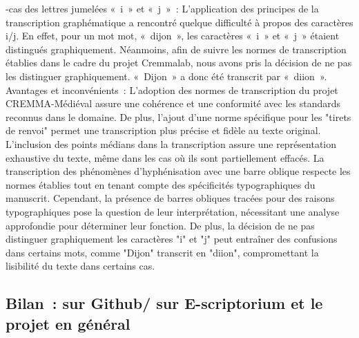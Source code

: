 \documentclass[12pt,a4paper,oneside]{article} %
\begin{document}
-cas des lettres jumelées « i » et « j » : L’application des principes de la transcription graphématique a rencontré quelque difficulté à propos des caractères i/j. En effet, pour un mot mot, « dijon », les caractères « i » et « j » étaient distingués graphiquement. Néanmoins, afin de suivre les normes de transcription établies dans le cadre du projet Cremmalab, nous avons pris la décision de ne pas les distinguer graphiquement. « Dijon » a donc été transcrit par « diion ».
Avantages et inconvénients : L'adoption des normes de transcription du projet CREMMA-Médiéval assure une cohérence et une conformité avec les standards reconnus dans le domaine. De plus, l'ajout d'une norme spécifique pour les "tirets de renvoi" permet une transcription plus précise et fidèle au texte original. L'inclusion des points médians dans la transcription assure une représentation exhaustive du texte, même dans les cas où ils sont partiellement effacés. La transcription des phénomènes d'hyphénisation avec une barre oblique respecte les normes établies tout en tenant compte des spécificités typographiques du manuscrit. Cependant, la présence de barres obliques tracées pour des raisons typographiques pose la question de leur interprétation, nécessitant une analyse approfondie pour déterminer leur fonction. De plus, la décision de ne pas distinguer graphiquement les caractères "i" et "j" peut entraîner des confusions dans certains mots, comme "Dijon" transcrit en "diion", compromettant la lisibilité du texte dans certains cas.

\subsection{Bilan : sur Github/ sur E-scriptorium et le projet en général}
\end{document}

